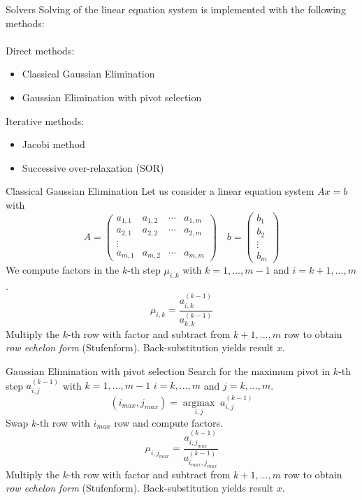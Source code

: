 \documentclass{beamer}
\newcommand{\argmax}[1]{\underset{#1}{\operatorname{argmax}}\;}
\begin{document}
	\begin{frame}{Solvers}
		Solving of the linear equation system is implemented with the following methods: \\~\\
		Direct methods:\\
		\begin{itemize}
			\item Classical Gaussian Elimination\\
			\item Gaussian Elimination with pivot selection
		\end{itemize}
		
		Iterative methods:
		\begin{itemize}
			\item Jacobi method
			\item Successive over-relaxation (SOR) 
		\end{itemize}
	\end{frame}
	
	\begin{frame}{Classical Gaussian Elimination}
		Let us consider a linear equation system $Ax = b$ with
		\begin{equation*}
			A = 
			\begin{pmatrix}
				a_{1,1}	& a_{1,2} & \cdots & a_{1,m}\\
				a_{2,1} & a_{2,2} & \cdots & a_{2,m}\\
				\vdots & & &\\
				a_{m,1} & a_{m, 2} & \cdots & a_{m,m}
			\end{pmatrix} \quad b = \begin{pmatrix}
				b_1\\
				b_2\\
				\vdots\\
				b_m
			\end{pmatrix}
		\end{equation*}
		We compute factors in the $k$-th step $\mu_{i,k}$ with $k=1,...,m-1$ and  $i=k+1,...,m$. 
		\begin{equation*}
			\mu_{i,k} = \frac{a_{i,k}^{(k-1)}}{a_{k,k}^{(k-1)}}
		\end{equation*}
		Multiply the $k$-th row  with factor and subtract from $k+1,...,m$ row to obtain \textit{row echelon form} (Stufenform). Back-substitution yields result $x$. 
	\end{frame}

	\begin{frame}{Gaussian Elimination with pivot selection}
	Search for the maximum pivot in $k$-th step $a_{i,j}^{(k-1)}$ with $k=1,...,m-1$ $i=k,...,m$ and $j=k,...,m$. 
		\begin{equation*}
			(i_{max},j_{max}) = \argmax{i,j} a_{i,j}^{(k-1)}
		\end{equation*}
		Swap $k$-th row with $i_{max}$ row and compute factors.
		\begin{equation*}
			\mu_{i,j_{max}} = \frac{a_{i,j_{max}}^{(k-1)}}{a_{i_{max},j_{max}}^{(k-1)}}
		\end{equation*}
		Multiply the $k$-th row  with factor and subtract from $k+1,...,m$ row to obtain \textit{row echelon form} (Stufenform). Back-substitution yields result $x$. 
	\end{frame} 
	
\end{document}
